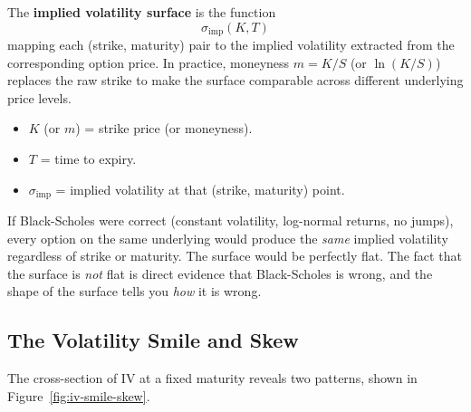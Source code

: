 \begin{definition}
\label{def:iv-surface}
The \textbf{implied volatility surface} is the function
\begin{equation}
  \sigma_{\text{imp}}(K, T)
  \label{eq:iv-surface}
\end{equation}
mapping each (strike, maturity) pair to the implied volatility extracted from the corresponding option price.
In practice, moneyness $m = K/S$ (or $\ln(K/S)$) replaces the raw strike to make the surface comparable across different underlying price levels.
\begin{itemize}[nosep]
  \item $K$ (or $m$) = strike price (or moneyness).
  \item $T$ = time to expiry.
  \item $\sigma_{\text{imp}}$ = implied volatility at that (strike, maturity) point.
\end{itemize}
\end{definition}

\begin{keyidea}
If Black-Scholes were correct (constant volatility, log-normal returns, no jumps), every option on the same underlying would produce the \emph{same} implied volatility regardless of strike or maturity.
The surface would be perfectly flat.
The fact that the surface is \emph{not} flat is direct evidence that Black-Scholes is wrong, and the shape of the surface tells you \emph{how} it is wrong.
\end{keyidea}

\subsection{The Volatility Smile and Skew}
\label{sec:smile-skew}

The cross-section of IV at a fixed maturity reveals two patterns, shown in Figure~\ref{fig:iv-smile-skew}.

